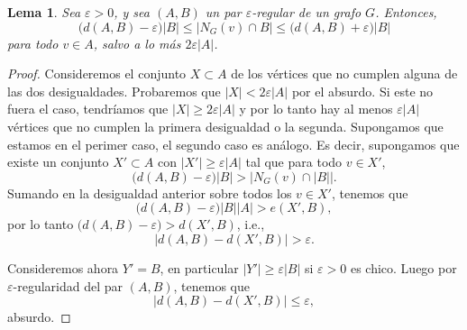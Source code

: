 \documentclass[12pt]{report}
\theoremstyle{plain}
\newtheorem{lemma}[theorem]{Lema}
\theoremstyle{definition}
\newcommand{\abs}[1]{\left \vert #1 \right \vert}
\begin{document}
\begin{lemma}\label{lema:regularidad de szemeredi - lema 2}
Sea $\varepsilon > 0$, y sea $(A,B)$ un par $\varepsilon$-regular de un grafo $G$. Entonces,
\[
    \big ( d(A,B) - \varepsilon \big ) \abs B \leq \abs{N_G (v) \cap B} \leq \big ( d(A,B)
    + \varepsilon \big ) \abs B
\]
para todo $v \in A$, salvo a lo más $2 \varepsilon \abs A$.
\end{lemma}
\begin{proof}
Consideremos el conjunto $X \subset A$ de los vértices que no cumplen alguna de las dos desigualdades. Probaremos que $\abs X < 2 \varepsilon \abs A$ por el absurdo. Si este no fuera el caso, tendríamos que $\abs X \geq 2 \varepsilon \abs A$ y por lo tanto hay al menos $\varepsilon \abs A$ vértices que no cumplen la primera desigualdad o la segunda. Supongamos que estamos en el perimer caso, el segundo caso es análogo. Es decir, supongamos que existe un conjunto $X' \subset A$ con $\abs{X'} \geq \varepsilon \abs A$ tal que para todo $v \in X'$,
\[
    \big ( d(A,B) - \varepsilon \big) \abs B > \abs{N_G (v) \cap \abs B}.
\]
Sumando en la desigualdad anterior sobre todos los $v \in X'$, tenemos que
\[
    \big ( d(A,B) - \varepsilon \big ) \abs B \abs A > e(X', B),
\]
por lo tanto $\big ( d (A,B) - \varepsilon \big ) >d(X', B)$, i.e.,
\[
    \abs {d(A,B) - d(X', B)} > \varepsilon.
\]

Consideremos ahora $Y' = B$, en particular $\abs {Y'} \geq \varepsilon \abs B$ si $\varepsilon > 0$ es chico. Luego por $\varepsilon$-regularidad del par $(A,B)$, tenemos que
\[
    \abs{d(A,B) - d(X', B)} \leq \varepsilon,
\]
absurdo.
\end{proof}
\end{document}
